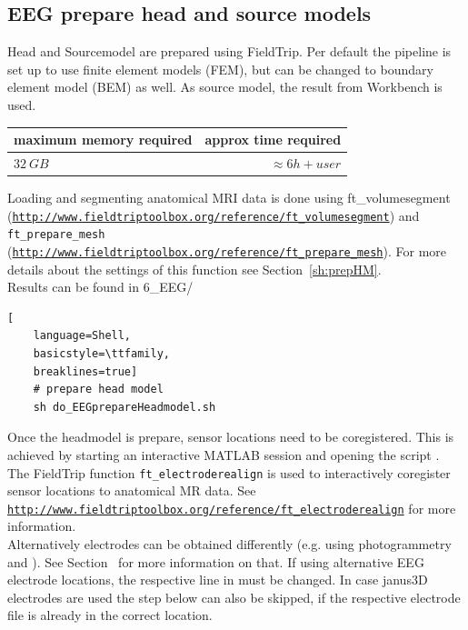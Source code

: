 \documentclass[12pt,a4paper]{scrartcl}
\begin{document}
\subsection{EEG prepare head and source models}
Head and Sourcemodel are prepared using FieldTrip. Per default the pipeline is set up to use finite element models (FEM), but can be changed to boundary element model (BEM) as well. As source model, the result from Workbench is used.
\label{sec:Sourcemodel}
\begin{table}[h]
\begin{tabular}{l | r}
\toprule
maximum memory required & approx time required\\\toprule
$32~GB$ & $\approx 6h+user$ \\\bottomrule
\end{tabular}
\end{table}
Loading and segmenting anatomical MRI data is done using ft\_volumesegment (\href{http://www.fieldtriptoolbox.org/reference/ft\_volumesegment}{\nolinkurl{http://www.fieldtriptoolbox.org/reference/ft\_volumesegment}}) and \texttt{ft\_prepare\_mesh} (\href{http://www.fieldtriptoolbox.org/reference/ft\_prepare\_mesh}{\nolinkurl{http://www.fieldtriptoolbox.org/reference/ft\_prepare\_mesh}}). For more details about the settings of this function see Section~\ref{sh:prepHM}.\\

\noindent Results can be found in 6\_EEG/\\
\begin{lstlisting}[
    language=Shell,
    basicstyle=\ttfamily,
    breaklines=true]
    # prepare head model
    sh do_EEGprepareHeadmodel.sh
\end{lstlisting}
Once the headmodel is prepare, sensor locations need to be coregistered. This is achieved by starting an interactive MATLAB session and opening the script \texttt{}. The FieldTrip function \texttt{ft\_electroderealign} is used to interactively coregister sensor locations to anatomical MR data. See \href{http://www.fieldtriptoolbox.org/reference/ft\_electroderealign}{\nolinkurl{http://www.fieldtriptoolbox.org/reference/ft\_electroderealign}} for more information.\\

\noindent Alternatively electrodes can be obtained differently (e.g. using photogrammetry and \texttt{}). See Section~ for more information on that. If using alternative EEG electrode locations, the respective line in \texttt{} must be changed. In case janus3D electrodes are used the step below can also be skipped, if the respective electrode file is already in the correct location.
\end{document}
